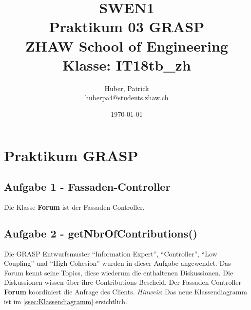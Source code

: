 \documentclass[11pt,ngerman]{article}
\newcommand{\quotes}[1]{``#1''}
\begin{document}
    \title{SWEN1\\Praktikum 03 GRASP\\
        \vspace{1cm}
        \small{ZHAW  School of Engineering\\Klasse: IT18tb\_zh}
        \vspace{1.5cm}
    }
    \author{
        Huber, Patrick\\
        \small{huberpa4@students.zhaw.ch}
        \vspace{1.5cm}
    }
   \date{\today}

    \maketitle
    \newpage

    \tableofcontents
    \listoffigures
    \lstlistoflistings
    \newpage

    \section{Praktikum GRASP}

    \subsection{Aufgabe 1 - Fassaden-Controller}
    Die Klasse \textbf{Forum} ist der Fassaden-Controller.

     \subsection{Aufgabe 2 - getNbrOfContributions()}
     Die GRASP Entwurfsmuster \quotes{Information Expert}, \quotes{Controller}, \quotes{Low Coupling} und \quotes{High Cohesion} wurden in dieser Aufgabe angewendet. Das Forum kennt seine Topics, diese wiederum die enthaltenen Diskussionen. Die Diskussionen wissen über ihre Contributions Bescheid. Der Fassaden-Controller \textbf{Forum} koordiniert die Anfrage des Clients. \newline
     \textit{Hinweis}: Das neue Klassendiagramm ist im \autoref{ssec:Klassendiagramm} ersichtlich.
\end{document}
